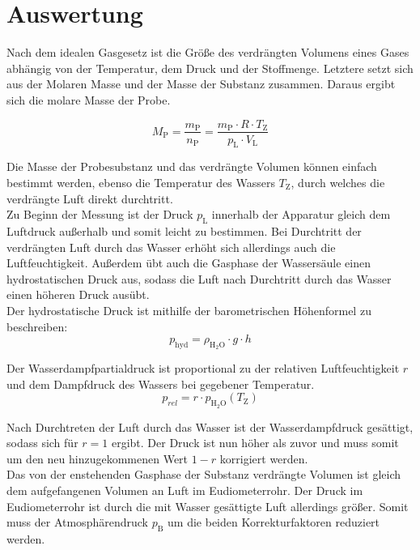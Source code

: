 \documentclass[12pt,a4paper,titlepage,headinclude,bibtotoc]{scrartcl}
\begin{document}
\section{Auswertung}

Nach dem idealen Gasgesetz ist die Größe des verdrängten Volumens eines Gases abhängig von der Temperatur, dem Druck und der Stoffmenge. Letztere setzt sich aus der Molaren Masse und der Masse der Substanz zusammen. Daraus ergibt sich die molare Masse der Probe.

\begin{equation}
M_\mathrm{P} = \frac{m_\mathrm{P}}{n_\mathrm{P}} =\frac{m_\mathrm{P} \cdot R \cdot T_\mathrm{Z}}{p_\mathrm{L} \cdot V_\mathrm{L}}
\end{equation}

Die Masse der Probesubstanz und das verdrängte Volumen können einfach bestimmt werden, ebenso die Temperatur des Wassers $T_\mathrm{Z}$, durch welches die verdrängte Luft direkt durchtritt. \\
Zu Beginn der Messung ist der Druck $p_\mathrm{L}$ innerhalb der Apparatur gleich dem Luftdruck außerhalb und somit leicht zu bestimmen. Bei Durchtritt der verdrängten Luft durch das Wasser erhöht sich allerdings auch die Luftfeuchtigkeit. Außerdem übt auch die Gasphase der Wassersäule einen hydrostatischen Druck aus, sodass die Luft nach Durchtritt durch das Wasser einen höheren Druck ausübt. \\
Der hydrostatische Druck ist mithilfe der barometrischen Höhenformel zu beschreiben:\\

\begin{equation}
p_\mathrm{hyd}= \rho_\mathrm{H_2O} \cdot g \cdot h
\end{equation}

Der Wasserdampfpartialdruck ist proportional zu der relativen Luftfeuchtigkeit $r$ und dem Dampfdruck des Wassers bei gegebener Temperatur. \\

\begin{equation}
p_{rel} = r\cdot p_\mathrm{H_2O}(T_\mathrm{Z})
\end{equation}

Nach Durchtreten der Luft durch das Wasser ist der Wasserdampfdruck gesättigt, sodass sich für $r = 1$ ergibt. Der Druck ist nun höher als zuvor und muss somit um den neu hinzugekommenen Wert $1- r$ korrigiert werden. \\
Das von der enstehenden Gasphase der Substanz verdrängte Volumen ist gleich dem aufgefangenen Volumen an Luft im Eudiometerrohr. Der Druck im Eudiometerrohr ist durch die mit Wasser gesättigte Luft allerdings größer. Somit muss der Atmosphärendruck $p_\mathrm{B}$ um die beiden Korrekturfaktoren reduziert werden. 
\end{document}
